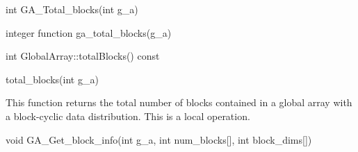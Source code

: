 \documentclass[12pt]{article}
\begin{document}

\begin{capi}
\begin{ccode}
int GA_Total_blocks(int g_a)
\end{ccode}
\begin{funcargs}
\end{funcargs}
\end{capi}

\begin{fapi}
\begin{fcode}
integer function ga_total_blocks(g_a)
\end{fcode}
\begin{funcargs}
\end{funcargs}
\end{fapi}

\begin{cxxapi}
\begin{cxxcode}
int GlobalArray::totalBlocks() const
\end{cxxcode}
\end{cxxapi}

\begin{pyapi}
\begin{pycode}
total_blocks(int g_a)
\end{pycode}
\end{pyapi}
\local

\begin{desc}

This function returns the total number of blocks contained in a global array
with a block-cyclic data distribution. This is a local operation.

\end{desc}


\begin{capi}
\begin{ccode}
void GA_Get_block_info(int g_a, int num_blocks[], int block_dims[])
\end{ccode}
\begin{funcargs}
\end{funcargs}
\end{capi}
\end{document}
